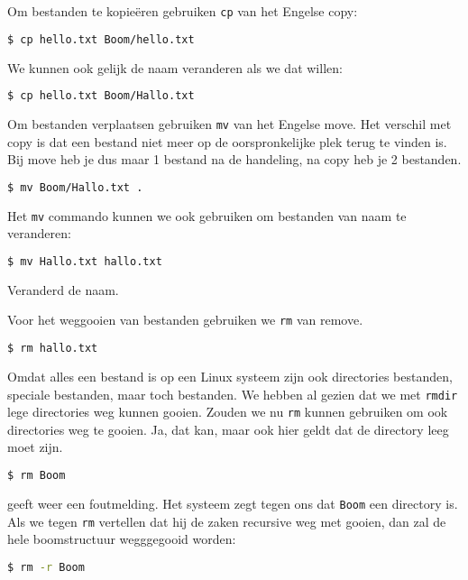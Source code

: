 Om bestanden te kopie\"eren gebruiken \texttt{cp} van het Engelse copy:
\begin{lstlisting}[language=bash]
$ cp hello.txt Boom/hello.txt
\end{lstlisting}
We kunnen ook gelijk de naam veranderen als we dat willen:
\begin{lstlisting}[language=bash]
$ cp hello.txt Boom/Hallo.txt
\end{lstlisting}

Om bestanden verplaatsen gebruiken \texttt{mv} van het Engelse move. Het verschil met copy is dat een bestand niet meer op de oorspronkelijke plek terug te vinden is. Bij move heb je dus maar 1 bestand na de handeling, na copy heb je 2 bestanden.
\begin{lstlisting}[language=bash]
$ mv Boom/Hallo.txt .
\end{lstlisting}
Het \texttt{mv} commando kunnen we ook gebruiken om bestanden van naam te veranderen:
\begin{lstlisting}[language=bash]
$ mv Hallo.txt hallo.txt
\end{lstlisting}
Veranderd de naam.

Voor het weggooien van bestanden gebruiken we \texttt{rm} van remove.
\begin{lstlisting}[language=bash]
$ rm hallo.txt
\end{lstlisting}

Omdat alles een bestand is op een Linux systeem zijn ook directories bestanden, speciale bestanden, maar toch bestanden. We hebben al gezien dat we met \texttt{rmdir} lege directories weg kunnen gooien. Zouden we nu \texttt{rm} kunnen gebruiken om ook directories weg te gooien. Ja, dat kan, maar ook hier geldt dat de directory leeg moet zijn.
\begin{lstlisting}[language=bash]
$ rm Boom
\end{lstlisting}
geeft weer een foutmelding. Het systeem zegt tegen ons dat \texttt{Boom} een directory is. Als we tegen \texttt{rm} vertellen dat hij de zaken recursive weg met gooien, dan zal de hele boomstructuur wegggegooid worden:
\begin{lstlisting}[language=bash]
$ rm -r Boom
\end{lstlisting}
